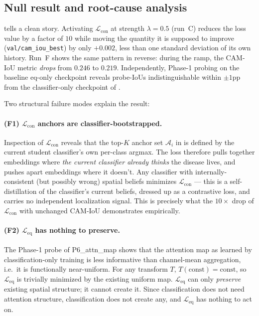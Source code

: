 \documentclass[11pt,a4paper]{article}
\newcommand{\Leq}{\mathcal{L}_{\mathrm{eq}}}
\newcommand{\Lcon}{\mathcal{L}_{\mathrm{con}}}
\begin{document}
\subsection{Null result and root-cause analysis}

 tells a clean story. Activating $\Lcon$ at strength
$\lambda{=}0.5$ (run~C) reduces the loss value by a factor of $10$
while moving the quantity it is supposed to improve
(\texttt{val/cam\_iou\_best}) by only $+0.002$, less than one standard
deviation of its own history. Run~F shows the same pattern in reverse:
during the ramp, the CAM-IoU metric \emph{drops} from $0.246$ to
$0.219$. Independently, Phase-1 probing on the baseline eq-only
checkpoint reveals probe-IoUs indistinguishable within $\pm 1$pp from
the classifier-only checkpoint of .

Two structural failure modes explain the result:

\paragraph{(F1) $\Lcon$ anchors are classifier-bootstrapped.}
Inspection of $\Lcon$ reveals that the top-$K$ anchor set $\mathcal{A}_i$
in  is defined by the current student classifier's own
per-class argmax. The loss therefore pulls together embeddings where
\emph{the current classifier already thinks} the disease lives, and
pushes apart embeddings where it doesn't. Any classifier with
internally-consistent (but possibly wrong) spatial beliefs minimizes
$\Lcon$ — this is a self-distillation of the classifier's current
beliefs, dressed up as a contrastive loss, and carries no independent
localization signal. This is precisely what the $10\times$ drop of
$\Lcon$ with unchanged CAM-IoU demonstrates empirically.

\paragraph{(F2) $\Leq$ has nothing to preserve.}
The Phase-1 probe of P6\_attn\_map shows that the attention map as
learned by classification-only training is less informative than
channel-mean aggregation, i.e.\ it is functionally near-uniform. For
any transform $T$, $T(\text{const})=\text{const}$, so $\Leq$ is
trivially minimized by the existing uniform map. $\Leq$ can only
\emph{preserve} existing spatial structure; it cannot create it. Since
classification does not need attention structure, classification does
not create any, and $\Leq$ has nothing to act on.
\end{document}
